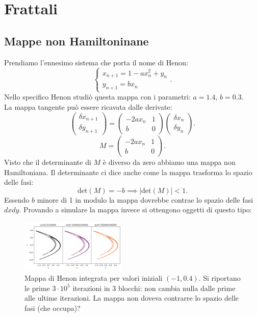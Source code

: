 \section{Frattali}%
\label{sec:Lezione 22}
\mylocaltoc
\subsection{Mappe non Hamiltoninane}%
\label{sub:Mappe non Hamiltoninane}
\begin{exmp}
    Prendiamo l'ennesimo sistema che porta il nome di Henon:
    \[
        \begin{cases}
            x_{n+1} = 1 - a x_n^2 + y_n\\
	    y_{n+1} = bx_n
        \end{cases}
    .\] 
    Nello specifico Henon studiò questa mappa con i parametri: $a = 1.4$, $b = 0.3$.\\
    La mappa tangente può essere ricavata dalle derivate:
    \[
        \begin{pmatrix} \delta x_{n+1}\\ \delta y_{n+1} \end{pmatrix} =
	\begin{pmatrix} 
	    -2ax_n & 1 \\
	    b & 0
	\end{pmatrix} 
	\begin{pmatrix} \delta x_n \\ \delta y_n \end{pmatrix} 
    .\] 
    \[
        M = 
	\begin{pmatrix} 
	    -2ax_n & 1 \\
	    b & 0
	\end{pmatrix} 
    .\] 
    Visto che il determinante di $M$ è diverso da zero abbiamo una mappa non Hamiltoniana. Il determinante ci dice anche come la mappa trasforma lo spazio delle fasi:
    \[
	\text{det}(M) = - b \implies  \left|\text{det}(M)\right| < 1 
    .\] 
    Essendo $b$ minore di 1 in modulo la mappa dovrebbe contrae lo spazio delle fasi $dxdy$. Provando a simulare la mappa invece si ottengono oggetti di questo tipo:
    \begin{figure}[H]
        \centering
	\includegraphics[width=0.45\textwidth]{figures/22_henonmap.png}
	\caption{\scriptsize Mappa di Henon integrata per valori iniziali $(-1, 0.4)$. Si riportano le prime $3\cdot 10^{5}$ iterazioni in 3 blocchi: non cambia nulla dalle prime alle ultime iterazioni. La mappa non doveva contrarre lo spazio delle fasi (che occupa)?}
        \label{fig:figures-22_henonmap-png}
    \end{figure}
\end{exmp}
